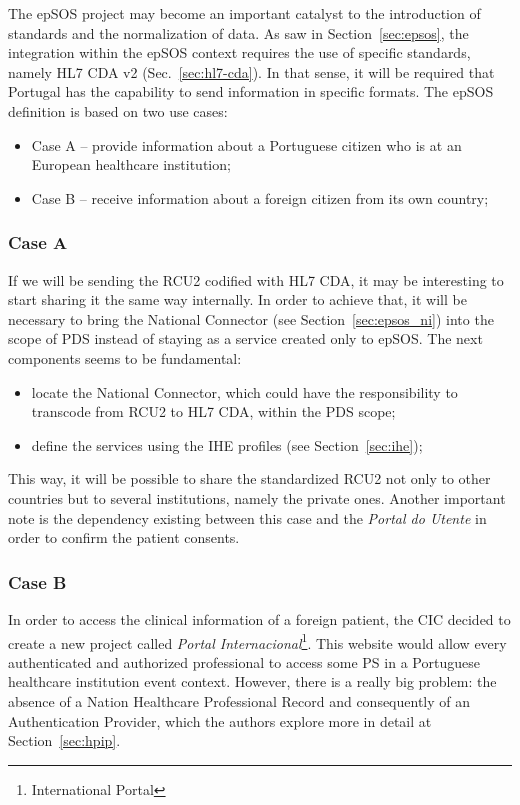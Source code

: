 The epSOS project may become an important catalyst to the introduction of standards and the normalization of data. As saw in Section~\ref{sec:epsos}, the integration within the epSOS context requires the use of specific standards, namely HL7 CDA v2 (Sec.~\ref{sec:hl7-cda}). In that sense, it will be required that Portugal has the capability to send information in specific formats. The epSOS definition is based on two use cases:
\begin{itemize}
\item Case A -- provide information about a Portuguese citizen who is at an European healthcare institution;
\item Case B -- receive information about a foreign citizen from its own country;
\end{itemize}


\subsubsection{Case A}

If we will be sending the RCU2 codified with HL7 CDA, it may be interesting to start sharing it the same way internally. In order to achieve that, it will be necessary to bring the National Connector (see Section~\ref{sec:epsos_ni}) into the scope of PDS instead of staying as a service created only to epSOS. The next components seems to be fundamental:
\begin{itemize}
\item locate the National Connector, which could have the responsibility to transcode from RCU2 to HL7 CDA, within the PDS scope;
\item define the services using the IHE profiles (see Section~\ref{sec:ihe});
\end{itemize}

This way, it will be possible to share the standardized RCU2 not only to other countries but to several institutions, namely the private ones. Another important note is the dependency existing between this case and the \textit{Portal do Utente} in order to confirm the patient consents.

\subsubsection{Case B}

In order to access the clinical information of a foreign patient, the CIC decided to create a new project called \textit{Portal Internacional}\footnote{International Portal}. This website would allow every authenticated and authorized professional to access some PS in a Portuguese healthcare institution event context. However, there is a really big problem: the absence of a Nation Healthcare Professional Record and consequently of an Authentication Provider, which the authors explore more in detail at Section~\ref{sec:hpip}.






